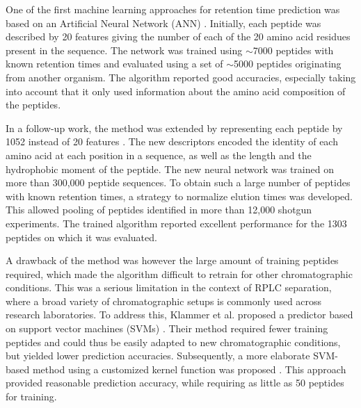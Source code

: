 \documentclass[a4paper]{article}
\begin{document}
\vspace{0.15cm}

One of the first machine learning approaches for retention time
prediction was based on an Artificial Neural Network
(ANN) \cite{petritis2003}. Initially, each peptide was described by 20
features giving the number of each of the 20 amino acid residues
present in the sequence. The network was trained using $\sim$7000
peptides with known retention times and evaluated using a set of
$\sim$5000 peptides originating from another organism. The algorithm
reported good accuracies, especially taking into account that it only
used information about the amino acid composition of the peptides.

\vspace{0.15cm}

In a follow-up work, the method was extended by representing each
 peptide by 1052 instead of 20
 features \cite{petritis2006improved}. The new descriptors encoded the
 identity of each amino acid at each position in a sequence, as well
 as the length and the hydrophobic moment of the peptide. The new
 neural network was trained on more than 300,000 peptide sequences. To
 obtain such a large number of peptides with known retention times, a
 strategy to normalize elution times was developed. This allowed
 pooling of peptides identified in more than 12,000 shotgun
 experiments. The trained algorithm reported excellent performance for
 the 1303 peptides on which it was evaluated.

\vspace{0.15cm}

A drawback of the method was however the large amount of training
peptides required, which made the algorithm difficult to retrain for
other chromatographic conditions. This was a serious limitation in the
context of RPLC separation, where a broad variety of chromatographic
setups is commonly used across research laboratories. To address this,
Klammer et al. proposed a predictor based on support vector machines
(SVMs) \cite{klammer2007improving}. Their method required fewer
training peptides and could thus be easily adapted to new
chromatographic conditions, but yielded lower prediction
accuracies. Subsequently, a more elaborate SVM-based method using a
customized kernel function was proposed \cite{rtpredict, rtpredictImproved}. This
approach provided reasonable prediction accuracy, while requiring as
little as 50 peptides for training.

\end{document}
